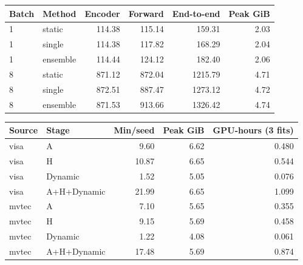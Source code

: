 \begin{tabular}{llrrrr}
\toprule
Batch & Method & Encoder & Forward & End-to-end & Peak GiB \\
\midrule
1 & static & 114.38 & 115.14 & 159.31 & 2.03 \\
1 & single & 114.38 & 117.82 & 168.29 & 2.04 \\
1 & ensemble & 114.44 & 124.12 & 182.40 & 2.06 \\
8 & static & 871.12 & 872.04 & 1215.79 & 4.71 \\
8 & single & 872.51 & 887.47 & 1273.12 & 4.72 \\
8 & ensemble & 871.53 & 913.66 & 1326.42 & 4.74 \\
\bottomrule
\end{tabular}

\begin{tabular}{llrrr}
\toprule
Source & Stage & Min/seed & Peak GiB & GPU-hours (3 fits) \\
\midrule
visa & A & 9.60 & 6.62 & 0.480 \\
visa & H & 10.87 & 6.65 & 0.544 \\
visa & Dynamic & 1.52 & 5.05 & 0.076 \\
visa & A+H+Dynamic & 21.99 & 6.65 & 1.099 \\
mvtec & A & 7.10 & 5.65 & 0.355 \\
mvtec & H & 9.15 & 5.69 & 0.458 \\
mvtec & Dynamic & 1.22 & 4.08 & 0.061 \\
mvtec & A+H+Dynamic & 17.48 & 5.69 & 0.874 \\
\bottomrule
\end{tabular}
